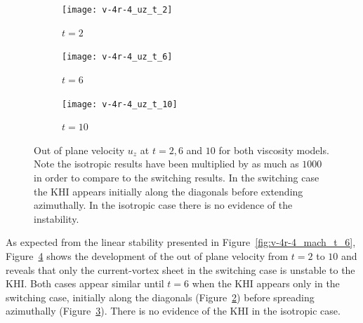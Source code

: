 \begin{figure}[t]
  \centering
    \begin{subfigure}{0.32\textwidth}
      \texttt{[image: v-4r-4\_uz\_t\_2]}
      \caption{$t=2$}
      \label{fig:v-4r-4_uz_t_2}
    \end{subfigure}
    \begin{subfigure}{0.32\textwidth}
      \texttt{[image: v-4r-4\_uz\_t\_6]}
      \caption{$t=6$}
      \label{fig:v-4r-4_uz_t_6}
    \end{subfigure}
    \begin{subfigure}{0.32\textwidth}
      \texttt{[image: v-4r-4\_uz\_t\_10]}
      \caption{$t=10$}
      \label{fig:v-4r-4_uz_t_10}
    \end{subfigure}
\caption{Out of plane velocity $u_z$ at $t=2, 6$ and $10$ for both viscosity models. Note the isotropic results have been multiplied by as much as $1000$ in order to compare to the switching results. In the switching case the KHI appears initially along the diagonals before extending azimuthally. In the isotropic case there is no evidence of the instability.}
\label{fig:out_of_plane_velocity}%
\end{figure}

As expected from the linear stability presented in Figure~\ref{fig:v-4r-4_mach_t_6}, Figure~\ref{fig:out_of_plane_velocity} shows the development of the out of plane velocity from $t=2$ to $10$ and reveals that only the current-vortex sheet in the switching case is unstable to the KHI. Both cases appear similar until $t=6$ when the KHI appears only in the switching case, initially along the diagonals (Figure~\ref{fig:v-4r-4_uz_t_6}) before spreading azimuthally (Figure~\ref{fig:v-4r-4_uz_t_10}). There is no evidence of the KHI in the isotropic case.

